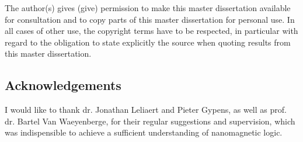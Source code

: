 \documentclass[11pt,a4paper,english,twoside]{article}
\begin{document}
\shipout\null %

\newpage
{}
\begin{center}
    The author(s) gives (give) permission to make this master dissertation available for consultation and to copy parts of this master dissertation for personal use. In all cases of other use, the copyright terms have to be respected, in particular with regard to the obligation to state explicitly the source when quoting results from this master dissertation.
\end{center}
\subsection*{Acknowledgements}
I would like to thank dr. Jonathan Leliaert and Pieter Gypens, as well as prof. dr. Bartel Van Waeyenberge, for their regular suggestions and supervision, which was indispensible to achieve a sufficient understanding of nanomagnetic logic.
\end{document}
